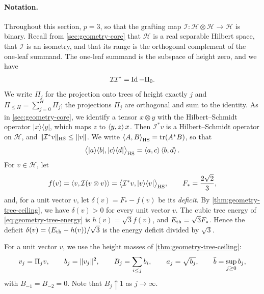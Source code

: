 \paragraph{Notation.}
Throughout this section, $p=3$, so that the grafting map $\mathcal I\colon\mathcal H\otimes\mathcal H\to\mathcal H$ is binary. Recall from \cref{sec:geometry-core} that $\mathcal H$ is a real separable Hilbert space, that $\mathcal I$ is an isometry, and that its range is the orthogonal complement of the one-leaf summand. The one-leaf summand is the subspace of height zero, and we have
\begin{equation}\label{eq:geometry-graft-range}
 \mathcal I\mathcal I^*=\operatorname{Id}-\Pi_0 .
\end{equation}
We write $\Pi_j$ for the projection onto trees of height exactly $j$ and $\Pi_{\le H}=\sum_{j=0}^H\Pi_j$; the projections $\Pi_j$ are orthogonal and sum to the identity. As in \cref{sec:geometry-core}, we identify a tensor $x\otimes y$ with the Hilbert--Schmidt operator $|x\rangle\langle y|$, which maps $z$ to $\left\langle y,z\right\rangle x$. Then $\mathcal I^*v$ is a Hilbert--Schmidt operator on $\mathcal H$, and $\lVert\mathcal I^*v\rVert_{\mathrm{HS}}\le\lVert v\rVert$. We write $\left\langle A,B\right\rangle_{\mathrm{HS}}=\operatorname{tr}(A^*B)$, so that
\[
 \bigl\langle |a\rangle\langle b|,|c\rangle\langle d|\bigr\rangle_{\mathrm{HS}}
 =\left\langle a,c\right\rangle\left\langle b,d\right\rangle .
\]
For $v\in\mathcal H$, let
\[
 f(v)=\left\langle v,\mathcal I(v\otimes v)\right\rangle
 =\bigl\langle\mathcal I^*v,|v\rangle\langle v|\bigr\rangle_{\mathrm{HS}},
 \qquad F_*=\frac{2\sqrt2}{3},
\]
and, for a unit vector $v$, let $\delta(v)=F_*-f(v)$ be its \emph{deficit}. By \cref{thm:geometry-tree-ceiling}, we have $\delta(v)>0$ for every unit vector $v$. The cubic tree energy of \eqref{eq:geometry-tree-energy} is $h(v)=\sqrt3 f(v)$, and $E_{\mathrm{th}}=\sqrt3F_*$. Hence the deficit $\delta(v)=(E_{\mathrm{th}}-h(v))/\sqrt3$ is the energy deficit divided by $\sqrt3$.

For a unit vector $v$, we use the height masses of \cref{thm:geometry-tree-ceiling}:
\[
 v_j=\Pi_jv,\qquad b_j=\lVert v_j\rVert^2,\qquad B_j=\sum_{i\le j}b_i,\qquad
 a_j=\sqrt{b_j},\qquad \bar b=\sup_{j\ge0}b_j,
\]
with $B_{-1}=B_{-2}=0$. Note that $B_j\uparrow1$ as $j\to\infty$.

